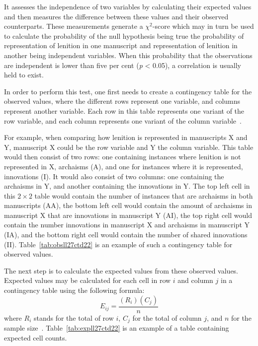 It assesses the independence of two variables by calculating their expected values and then measures the difference between these values and their observed counterparts. These measurements generate a \(\chi^2\)-score which may in turn be used to calculate the probability of the null hypothesis being true \ie the probability of  representation of lenition in one manuscript and representation of lenition in another being independent variables. When this probability that the observations are independent is lower than five per cent (\emph{p} < 0.05), a correlation is usually held to exist.

In order to perform this test, one first needs to create a contingency table for the observed values, where the different rows represent one variable, and columns represent another variable. Each row in this table represents one variant of the row variable, and each column represents one variant of the column variable~\autocite[754]{MS_Statistics09}.

For example, when comparing how lenition is represented in manuscripts X and Y, manuscript X could be the row variable and Y the column variable. This table would then consist of two rows: one containing instances where lenition is not represented in X, \ie archaisms (A), and one for instances where it is represented, \ie innovations (I).  It would also consist of two columns: one containing the archaisms in Y, and another containing the innovations in Y. The top left cell in this \(2 \times 2\) table would contain the number of instances that are archaisms in both manuscripts (AA), the bottom left cell would contain the amount of archaisms in manuscript X that are innovations in manuscript Y (AI), the top right cell would contain the number innovations in manuscript X and archaisms in manuscript Y (IA), and the bottom right cell would contain the number of shared innovations (II). Table~\ref{tab:obsll27ctd22} is an example of such a contingency table for observed values.

The next step is to calculate the expected values from these observed values. Expected values may be calculated for each cell in row \(i\) and column \(j\) in a contingency table using the following formula:
\[E_{ij}=\frac{(R_i)(C_j)}{n}\]
where \(R_i\) stands for the total of row \(i\), \(C_j\) for the total of column \(j\), and \(n\) for the sample size~\autocite[755--756]{MS_Statistics09}. Table~\ref{tab:expll27ctd22} is an example of a table containing expected cell counts.



